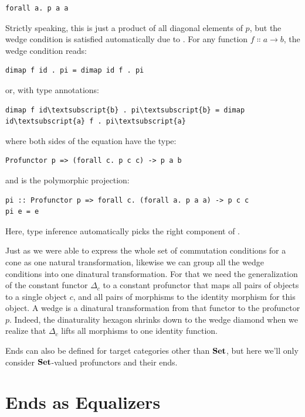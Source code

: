 \begin{Verbatim}
forall a. p a a
\end{Verbatim}
Strictly speaking, this is just a product of all diagonal elements of
$p$, but the wedge condition is satisfied automatically due to
. For any function
$f \Colon a \to b$, the wedge condition reads:

\begin{Verbatim}
dimap f id . pi = dimap id f . pi
\end{Verbatim}
or, with type annotations:

\begin{Verbatim}[commandchars=\\\{\}]
dimap f id\textsubscript{b} . pi\textsubscript{b} = dimap id\textsubscript{a} f . pi\textsubscript{a}
\end{Verbatim}
where both sides of the equation have the type:

\begin{Verbatim}
Profunctor p => (forall c. p c c) -> p a b
\end{Verbatim}
and  is the polymorphic projection:

\begin{Verbatim}
pi :: Profunctor p => forall c. (forall a. p a a) -> p c c
pi e = e
\end{Verbatim}
Here, type inference automatically picks the right component of
.

Just as we were able to express the whole set of commutation conditions
for a cone as one natural transformation, likewise we can group all the
wedge conditions into one dinatural transformation. For that we need the
generalization of the constant functor $\Delta_c$ to a constant
profunctor that maps all pairs of objects to a single object $c$,
and all pairs of morphisms to the identity morphism for this object. A
wedge is a dinatural transformation from that functor to the profunctor
$p$. Indeed, the dinaturality hexagon shrinks down to the wedge
diamond when we realize that $\Delta_c$ lifts all morphisms to one
identity function.

Ends can also be defined for target categories other than $\mathbf{Set}$,
but here we'll only consider $\mathbf{Set}$-valued profunctors and their
ends.

\section{Ends as Equalizers}


